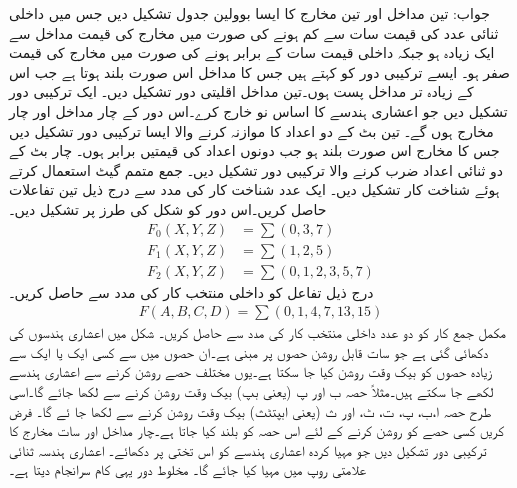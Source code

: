 جواب: 
تین مداخل اور تین مخارج  کا ایسا بوولین جدول تشکیل دیں جس میں  داخلی ثنائی عدد کی قیمت سات   سے کم ہونے کی صورت میں مخارج کی قیمت مداخل سے ایک زیادہ  ہو  جبکہ  داخلی قیمت سات کے برابر ہونے کی صورت میں مخارج کی قیمت صفر   ہو۔
 ایسے ترکیبی دور کو کہتے ہیں جس کا مداخل اس صورت بلند ہوتا ہے جب اس کے زیادہ تر مداخل پست ہوں۔تین  مداخل  اقلیتی دور تشکیل دیں۔
ایک ترکیبی دور تشکیل دیں جو اعشاری ہندسے کا اساس نو خارج  کرے۔اس دور کے چار مداخل اور چار مخارج ہوں گے۔
 تین بٹ کے دو اعداد کا موازنہ کرنے والا ایسا ترکیبی دور تشکیل دیں  جس کا مخارج اس صورت بلند ہو جب دونوں اعداد کی قیمتیں  برابر ہوں۔
 چار بٹ کے دو ثنائی اعداد ضرب کرنے والا ترکیبی دور تشکیل دیں۔
 جمع متمم گیٹ استعمال کرتے ہوئے  شناخت کار تشکیل دیں۔
ایک عدد   شناخت کار کی مدد سے   درج ذیل تین تفاعلات حاصل کریں۔اس دور کو شکل  کی طرز پر تشکیل دیں۔
\begin{align*}
F_0(X,Y,Z)&=\sum(0,3,7)\\
F_1(X,Y,Z)&=\sum(1,2,5)\\
F_2(X,Y,Z)&=\sum(0,1,2,3,5,7)
\end{align*}
 درج ذیل تفاعل کو   داخلی منتخب کار کی مدد سے حاصل  کریں۔
 \begin{align*}
 F(A,B,C,D)=\sum(0,1,4,7,13,15)
 \end{align*}
 مکمل جمع کار کو دو عدد داخلی منتخب کار کی مدد سے حاصل کریں۔
 شکل میں اعشاری ہندسوں کی   دکھائی  گئی ہے جو سات قابل روشن حصوں پر مبنی ہے۔ان حصوں میں سے  کسی ایک یا ایک سے زیادہ حصوں کو بیک وقت روشن کیا جا سکتا  ہے۔یوں مختلف حصے روشن کرنے سے اعشاری ہندسے لکھے جا  سکتے ہیں۔مثلاً   حصہ ب اور پ  (یعنی بپ)  بیک وقت روشن کرنے سے    لکھا جائے گا۔اسی طرح حصہ ا،ب،  پ، ت، ٹ، اور  ث (یعنی ابپتٹث)   بیک  وقت روشن کرنے سے  لکھا جا ئے گا۔   فرض کریں کسی حصے کو  روشن کرنے کے لئے اس حصہ  کو  بلند کیا جاتا ہے۔چار مداخل اور سات مخارج  کا   ترکیبی  دور تشکیل دیں جو مہیا کردہ اعشاری ہندسے کو اس تختی پر دکھائے۔ اعشاری ہندسہ  ثنائی علامتی روپ میں مہیا کیا جائے گا۔   مخلوط دور   یہی کام  سرانجام   دیتا ہے۔
